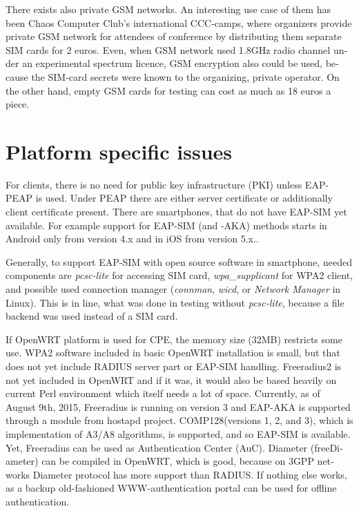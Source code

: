 \documentclass[12pt,a4paper,english]{tutthesis}
\begin{document}
\begin{otherlanguage}{english}
There exists also private GSM networks. An interesting use case
of them  has been Chaos Computer Club's international 
CCC-camps\cite{ccc}, where organizers 
provide private GSM network for attendees of conference
by distributing them separate SIM cards for 2 euros.  Even, when GSM
network used 1.8GHz radio channel under an experimental spectrum
licence,  GSM encryption also could be used, because the SIM-card secrets were known
to the organizing, private operator.
On the other hand, empty GSM cards for testing can cost as much as 
18 euros a piece\cite{smartjac-testsim}.


\section{Platform specific issues}
\label{sec-6-3}

\label{sec:pcsc}

For clients, there is no need for public key infrastructure (PKI)
unless EAP-PEAP is used. Under PEAP there are either server
certificate or additionally client certificate present.  There are
smartphones, that do not have EAP-SIM yet available.  For example
support for EAP-SIM (and -AKA) methods starts in Android only from
version 4.x and in iOS from version 5.x.\cite{sim-support}.

Generally, to support EAP-SIM  with open source software in 
smartphone, needed components are \emph{pcsc-lite} for accessing SIM card, \emph{wpa\_supplicant} for
WPA2 client, and possible used connection manager (\emph{connman},
\emph{wicd}, or \emph{Network Manager} in Linux). This is in line, what was done in testing without \emph{pcsc-lite},
because a file backend was used instead of a SIM card.




If OpenWRT platform is used for CPE, the memory size (32MB) restricts
some use.
WPA2 software included in basic OpenWRT installation is small,
but that does not yet include RADIUS server part or EAP-SIM handling.
Freeradius2 is not yet included in OpenWRT and if it was, it would
also be based heavily on current Perl environment which itself needs a
lot of space.  Currently, as of August 9th, 2015, Freeradius is
running on version 3 and EAP-AKA is supported through a module from
hostapd project.  COMP128(versions 1, 2, and 3), which is
implementation of A3/A8 algorithms, is supported\cite{freeradius2},
and so EAP-SIM is available.  Yet, Freeradius can be used as
Authentication Center (AuC).  Diameter (freeDiameter) can be compiled
in OpenWRT, which is good, because on 3GPP networks Diameter protocol
has more support than RADIUS.  If nothing else works, as a backup
old-fashioned WWW-authentication portal can be used for offline
authentication.











\end{otherlanguage}
\end{document}

